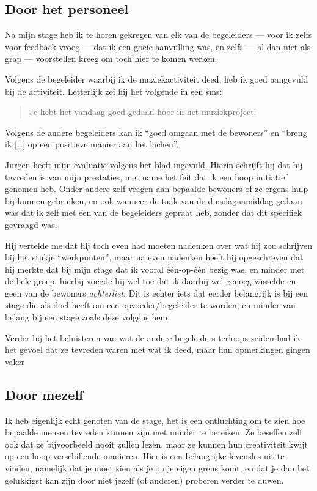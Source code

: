 \documentclass[a4paper,12pt]{article}
\begin{document}
\subsection{Door het personeel}
Na mijn stage heb ik te horen gekregen van elk van de begeleiders --- voor ik zelfs voor feedback vroeg --- dat ik een goeie aanvulling was, en zelfs --- al dan niet als grap --- voorstellen kreeg om toch hier te komen werken.

Volgens de begeleider waarbij ik de muziekactiviteit deed, heb ik goed aangevuld bij de activiteit. Letterlijk zei hij het volgende in een sms:

\begin{quotation}
  Je hebt het vandaag goed gedaan hoor in het muziekproject!
\end{quotation}

Volgens de andere begeleiders kan ik ``goed omgaan met de bewoners'' en ``breng ik [\dots] op een positieve manier aan het lachen''.

Jurgen heeft mijn evaluatie volgens het blad ingevuld. Hierin schrijft hij dat hij tevreden is van mijn prestaties, met name het feit dat ik een hoop initiatief genomen heb. Onder andere zelf vragen aan bepaalde bewoners of ze ergens hulp bij kunnen gebruiken, en ook wanneer de taak van de dinsdagnamiddag gedaan was dat ik zelf met een van de begeleiders gepraat heb, zonder dat dit specifiek gevraagd was.

Hij vertelde me dat hij toch even had moeten nadenken over wat hij zou schrijven bij het stukje ``werkpunten'', maar na even nadenken heeft hij opgeschreven dat hij merkte dat bij mijn stage dat ik vooral één-op-één bezig was, en minder met de hele groep, hierbij voegde hij wel toe dat ik daarbij wel genoeg wisselde en geen van de bewoners \emph{achterliet}. Dit is echter iets dat eerder belangrijk is bij een stage die als doel heeft om een opvoeder/begeleider te worden, en minder van belang bij een stage zoals deze volgens hem.

Verder bij het beluisteren van wat de andere begeleiders terloops zeiden had ik het gevoel dat ze tevreden waren met wat ik deed, maar hun opmerkingen gingen vaker

\subsection{Door mezelf}
Ik heb eigenlijk echt genoten van de stage, het is een ontluchting om te zien hoe bepaalde mensen tevreden kunnen zijn met minder te bereiken. Ze beseffen zelf ook dat ze bijvoorbeeld nooit zullen lezen, maar ze kunnen hun creativiteit kwijt op een hoop verschillende manieren. Hier is een belangrijke levensles uit te vinden, namelijk dat je moet zien als je op je eigen grens komt, en dat je dan het gelukkigst kan zijn door niet jezelf (of anderen) proberen verder te duwen.
\end{document}
